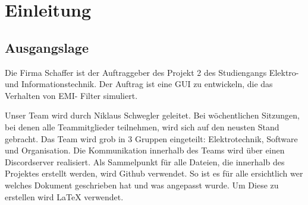 \section{Einleitung}
\subsection{Ausgangslage}

Die Firma Schaffer ist der Auftraggeber des Projekt 2 des Studiengangs Elektro- und Informationstechnik. Der Auftrag ist eine GUI zu entwickeln, die das Verhalten von EMI- Filter simuliert. 
 
Unser Team wird durch Niklaus Schwegler geleitet. 
Bei wöchentlichen Sitzungen, bei denen alle Teammitglieder teilnehmen, wird sich auf den neusten Stand gebracht. Das Team wird grob in 3 Gruppen eingeteilt: Elektrotechnik, Software und Organisation. Die Kommunikation innerhalb des Teams wird über einen Discordserver realisiert.  Als Sammelpunkt für alle Dateien, die innerhalb des Projektes erstellt werden, wird Github verwendet. So ist es für alle ersichtlich wer welches Dokument geschrieben hat und was angepasst wurde. Um Diese zu erstellen wird LaTeX verwendet. 

    







